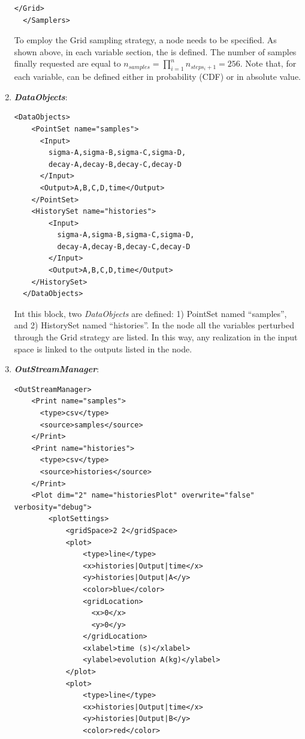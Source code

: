 \begin{enumerate}
\begin{lstlisting}[style=XML,morekeywords={arg,extension,pauseAtEnd,overwrite}]
    </Grid>
  </Samplers>  
\end{lstlisting}
  To employ the Grid sampling strategy, a 
   node needs to be specified. As shown above, in each variable section, the   is defined. 
  The number of samples finally requested are equal to $n_{samples} = \prod_{i=1}^{n} n_{steps_{i}+1} = 256$.
  Note that, for each variable, can be defined either in probability (CDF) or in absolute value.  
   \item \textbf{\textit{DataObjects}}:
\begin{lstlisting}[style=XML,morekeywords={arg,extension,pauseAtEnd,overwrite}]
  <DataObjects>
    <PointSet name="samples">
      <Input>
        sigma-A,sigma-B,sigma-C,sigma-D,
        decay-A,decay-B,decay-C,decay-D
      </Input>
      <Output>A,B,C,D,time</Output>
    </PointSet>
    <HistorySet name="histories">
        <Input>
          sigma-A,sigma-B,sigma-C,sigma-D,
          decay-A,decay-B,decay-C,decay-D
        </Input>
        <Output>A,B,C,D,time</Output>
    </HistorySet>
  </DataObjects>
\end{lstlisting}
  Int this block, two \textit{DataObjects} are defined: 1) PointSet named 
  ``samples'', and 2) HistorySet named ``histories''.
  In the  node all the variables 
  perturbed through the Grid strategy are listed. In this way, any
  realization in the input space is linked to the outputs listed in  the 
   node.
   \item \textbf{\textit{OutStreamManager}}:   
\begin{lstlisting}[style=XML,morekeywords={arg,extension,pauseAtEnd,overwrite}]
  <OutStreamManager>
    <Print name="samples">
      <type>csv</type>
      <source>samples</source>
    </Print>
    <Print name="histories">
      <type>csv</type>
      <source>histories</source>
    </Print>
    <Plot dim="2" name="historiesPlot" overwrite="false" verbosity="debug">
        <plotSettings>
            <gridSpace>2 2</gridSpace>
            <plot>
                <type>line</type>
                <x>histories|Output|time</x>
                <y>histories|Output|A</y>
                <color>blue</color>
                <gridLocation>
                  <x>0</x>
                  <y>0</y>
                </gridLocation>
                <xlabel>time (s)</xlabel>
                <ylabel>evolution A(kg)</ylabel>
            </plot>
            <plot>
                <type>line</type>
                <x>histories|Output|time</x>
                <y>histories|Output|B</y>
                <color>red</color>

\end{lstlisting}
\end{enumerate}
